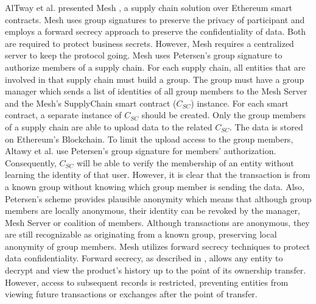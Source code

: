 AlTway et al. presented Mesh \cite{altawy2019mesh}, a supply chain solution over Ethereum smart contracts. Mesh uses group signatures to preserve the privacy of participant and employs a forward secrecy approach to preserve the confidentiality of data. Both are  required to protect business secrets. However, Mesh requires a centralized  server to keep the protocol going.  Mesh uses Petersen's group signature \cite{petersen1997convert} to authorize members of a supply chain. For each supply chain, all entities that are involved in that supply chain must build a group. The group must have a group manager which sends a list of identities of all group members to the Mesh Server and the Mesh's SupplyChain smart contract ($C_{SC}$) instance. For each smart contract, a separate instance of $C_{SC}$ should be created. Only the group members of a supply chain are able to upload data to the related $C_{SC}$. The data is stored on Ethereum's Blockchain. To limit the upload access to the group members, Altawy et al. \cite{altawy2019mesh} use Petersen's group signature \cite{petersen1997convert} for members' authorization. Consequently, $C_{SC}$ will be able to verify the membership of an entity without learning the identity of that user. However, it is clear that the transaction is from a known group without knowing which group member is sending the data. Also, Petersen's scheme provides plausible anonymity which means that although group members are locally anonymous, their identity can be revoked by the manager, Mesh Server or coalition of members. 
Although transactions are anonymous, they are still recognizable as originating from a known group, preserving local anonymity of group members.  Mesh utilizes forward secrecy techniques to protect data confidentiality. Forward secrecy, as described in \cite{chen2012communication}, allows any entity to decrypt and view the product's history up to the point of its ownership transfer. However, access to subsequent records is restricted, preventing entities from viewing future transactions or exchanges after the point of transfer. 






